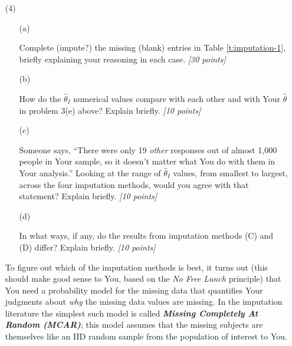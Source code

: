 \documentclass[12pt]{article}
\begin{document}
\begin{itemize}
\begin{table}[t!]
\begin{tabular}{c||ccccc||cc}
\end{tabular}

\end{table}
\item[(4)]

\begin{itemize}

\item[(a)]

Complete (impute?) the missing (blank) entries in Table \ref{t:imputation-1}, briefly explaining your reasoning in each case. \textit{[30 points]}

\vspace*{1.5in}

\item[(b)]

How do the $\hat{ \theta }_I$ numerical values compare with each other and with Your $\hat{ \theta }$ in problem 3(e) above? Explain briefly. \textit{[10 points]}

\vspace*{1.0in}

\item[(c)]

Someone says, ``There were only 19 \textit{other} responses out of almost 1,000 people in Your sample, so it doesn't matter what You do with them in Your analysis.'' Looking at the range of $\hat{ \theta }_I$ values, from smallest to largest, across the four imputation methods, would you agree with that statement? Explain briefly. \textit{[10 points]}

\vspace*{1.0in}

\item[(d)]

In what ways, if any, do the results from imputation methods (C) and (D) differ? Explain briefly. \textit{[10 points]}

\vspace*{1.0in}

\end{itemize}

To figure out which of the imputation methods is best, it turns out (this should make good sense to You, based on the \textit{No Free Lunch} principle) that You need a probability model for the missing data that quantifies Your judgments about \textit{why} the missing data values are missing. In the imputation literature the simplest such model is called \textbf{\textit{Missing Completely At Random (MCAR)}}; this model assumes that the missing subjects are themselves like an IID random sample from the population of interest to You.


\end{itemize}
\end{document}
